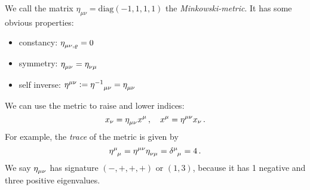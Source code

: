 We call the matrix $\eta_{\mu\nu}=\mathrm{diag}(-1,1,1,1)$ the
\emph{Minkowski-metric}. It has some obvious properties:
\begin{itemize}
    \item constancy: $\tensor{\eta}{_\mu_\nu_,_\varrho}=0$
    \item symmetry: $\tensor{\eta}{_\mu_\nu}=\tensor{\eta}{_\nu_\mu}$
    \item self inverse:
    $\tensor{\eta}{^\mu^\nu}:=\tensor{{\eta^{-1}}}{_\mu_\nu}=\tensor{\eta}{_\mu_\nu}$
\end{itemize}
We can use the metric to raise and lower indices:
\begin{equation}
    x_\nu=\tensor{\eta}{_\mu_\nu}x^\mu\, ,\quad x^\mu=\tensor{\eta}{^\mu^\nu}x_\nu\, .
\end{equation}
For example, the \emph{trace} of the metric is given by
\begin{equation}
    \tensor{\eta}{^\mu_\mu}=\tensor{\eta}{^\mu^\nu}\tensor{\eta}{_\nu_\mu}
    =\tensor{\delta}{^\mu_\mu}=4\, .
\end{equation}
We say $\tensor{\eta}{_\mu_\nu}$ has signature $(-,+,+,+)$ or $(1,3)$, because
it has 1 negative and three positive eigenvalues.
